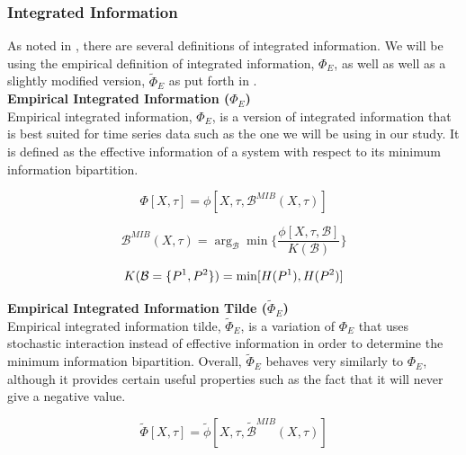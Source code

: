 \documentclass[a4paper,11pt]{article}
\begin{document}
\subsubsection{Integrated Information}
\label{II}

As noted in \cite{Barrett2011}, there are several definitions of integrated information. We will be using the empirical definition of integrated information, $\Phi_{E}$, as well as well as a slightly modified version, $\widetilde{\Phi}_{E}$ as put forth in \cite{Barrett2011}.\\

\noindent\textbf{Empirical Integrated Information ($\Phi_{E}$)}\\[2.5mm]
\noindent Empirical integrated information, $\Phi_{E}$, is a version of integrated information that is best suited for time series data such as the one we will be using in our study. It is defined as the effective information of a system with respect to its minimum information bipartition.

\begin{equation} \label{eq:ii}
\Phi [X, \tau] = \phi [X, \tau, \mathcal{B}^{MIB}(X, \tau)]
\end{equation}

\begin{equation} \label{eq:mib}
\mathcal{B}^{MIB}(X, \tau) = \arg_{\mathcal{B}} \min \Big\lbrace \frac{\phi [X, \tau, \mathcal{B}]}{K(\mathcal{B})} \Big\rbrace
\end{equation}

\begin{equation} \label{eq:norm}
K(\mathcal{B} = \lbrace P^1, P^2 \rbrace) = \min[H(P^1), H(P^2)]\\[2.5mm]
\end{equation}

\noindent\textbf{Empirical Integrated Information Tilde ($\widetilde{\Phi}_{E}$)}\\[2.5mm]
\noindent Empirical integrated information tilde, $\widetilde{\Phi}_{E}$, is a variation of $\Phi_{E}$ that uses stochastic interaction instead of effective information in order to determine the minimum information bipartition. Overall, $\widetilde{\Phi}_{E}$ behaves very similarly to $\Phi_{E}$, although it provides certain useful properties such as the fact that it will never give a negative value.

\begin{equation} \label{eq:ii-tilde}
\widetilde{\Phi} [X, \tau] = \tilde{\phi} [X, \tau, \widetilde{\mathcal{B}}^{MIB}(X, \tau)]
\end{equation}
\end{document}
